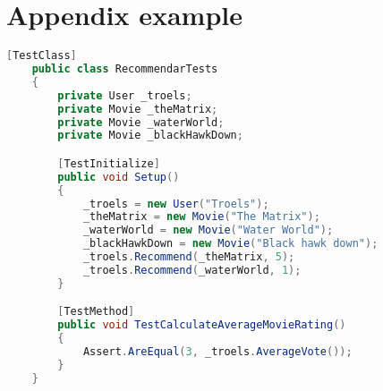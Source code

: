 \chapter[]{Appendix example}
\begin{lstlisting}[label=Sourcecode, caption=Fabulous sourcecode,language=java]
    [TestClass]
    public class RecommendarTests
    {
        private User _troels;
        private Movie _theMatrix;
        private Movie _waterWorld;
        private Movie _blackHawkDown;

        [TestInitialize]
        public void Setup()
        {
            _troels = new User("Troels");
            _theMatrix = new Movie("The Matrix");
            _waterWorld = new Movie("Water World");
            _blackHawkDown = new Movie("Black hawk down");
            _troels.Recommend(_theMatrix, 5);
            _troels.Recommend(_waterWorld, 1);
        }

        [TestMethod]
        public void TestCalculateAverageMovieRating()
        {
            Assert.AreEqual(3, _troels.AverageVote());
        }
    }
\end{lstlisting}